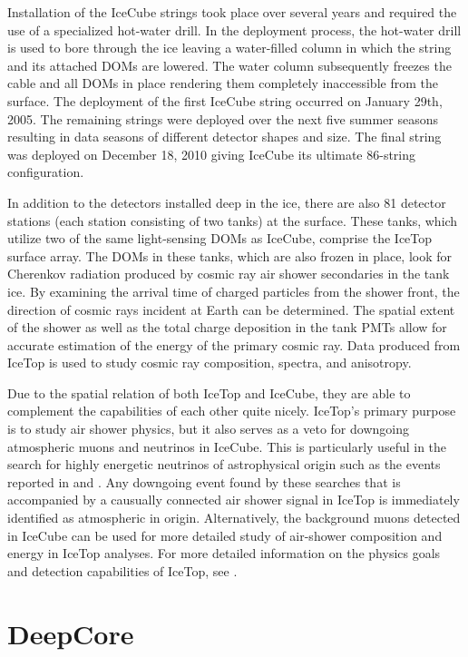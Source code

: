 \documentclass{gatech-thesis}
\begin{document}
Installation of the IceCube strings took place over several years and required the use of a specialized hot-water drill. In the deployment process, the hot-water drill is used to bore through the ice leaving a water-filled column in which the string and its attached DOMs are lowered. The water column subsequently freezes the cable and all DOMs in place rendering them completely inaccessible from the surface. The deployment of the first IceCube string occurred on January 29th, 2005. The remaining strings were deployed over the next five summer seasons resulting in data seasons of different detector shapes and size. The final string was deployed on December 18, 2010 giving IceCube its ultimate 86-string configuration.


In addition to the detectors installed deep in the ice, there are also 81 detector stations (each station consisting of two tanks) at the surface. These tanks, which utilize two of the same light-sensing DOMs as IceCube, comprise the IceTop surface array. The DOMs in these tanks, which are also frozen in place, look for Cherenkov radiation produced by cosmic ray air shower secondaries in the tank ice. By examining the arrival time of charged particles from the shower front, the direction of cosmic rays incident at Earth can be determined. The spatial extent of the shower as well as the total charge deposition in the tank PMTs allow for accurate estimation of the energy of the primary cosmic ray. Data produced from IceTop is used to study cosmic ray composition, spectra, and anisotropy.

Due to the spatial relation of both IceTop and IceCube, they are able to complement the capabilities of each other quite nicely. IceTop's primary purpose is to study air shower physics, but it also serves as a veto for downgoing atmospheric muons and neutrinos in IceCube. This is particularly useful in the search for highly energetic neutrinos of astrophysical origin such as the events reported in \cite{2013Sci...342E...1I} and \cite{2014PhRvL.113j1101A}. Any downgoing event found by these searches that is accompanied by a causually connected air shower signal in IceTop is immediately identified as atmospheric in origin. Alternatively, the background muons detected in IceCube can be used for more detailed study of air-shower composition and energy in IceTop analyses. For more detailed information on the physics goals and detection capabilities of IceTop, see \cite{2013NIMPA.700..188A}.


\section{DeepCore}
\end{document}
